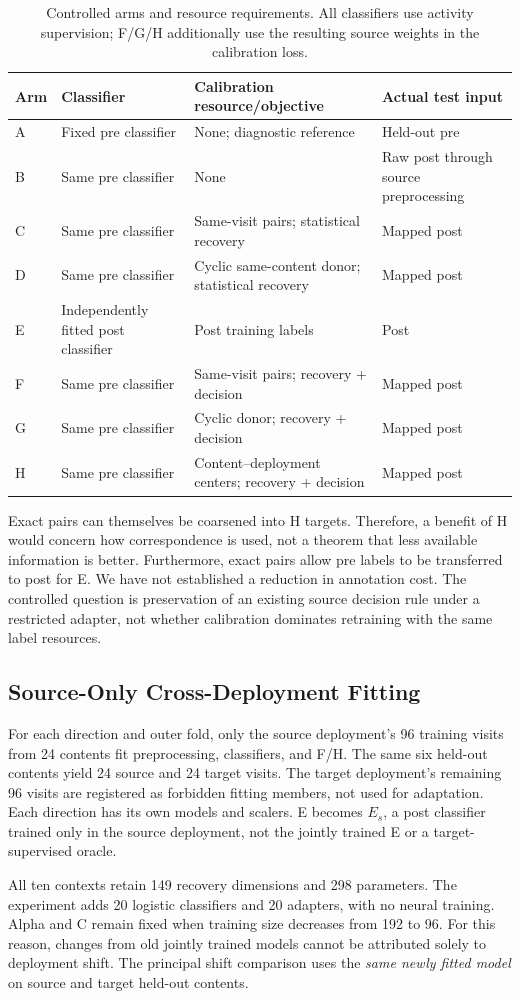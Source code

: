 \begin{table}[t]\centering\caption{Controlled arms and resource requirements. All classifiers use activity supervision; F/G/H additionally use the resulting source weights in the calibration loss.}\label{tab:arms}
\small\setlength{\tabcolsep}{5pt}\begin{tabular}{llll}\toprule
Arm & Classifier & Calibration resource/objective & Actual test input\\\midrule
A & Fixed pre classifier & None; diagnostic reference & Held-out pre\\
B & Same pre classifier & None & Raw post through source preprocessing\\
C & Same pre classifier & Same-visit pairs; statistical recovery & Mapped post\\
D & Same pre classifier & Cyclic same-content donor; statistical recovery & Mapped post\\
E & Independently fitted post classifier & Post training labels & Post\\
F & Same pre classifier & Same-visit pairs; recovery + decision & Mapped post\\
G & Same pre classifier & Cyclic donor; recovery + decision & Mapped post\\
H & Same pre classifier & Content--deployment centers; recovery + decision & Mapped post\\\bottomrule
\end{tabular}\end{table}

Exact pairs can themselves be coarsened into H targets. Therefore, a benefit of H would concern how correspondence is used, not a theorem that less available information is better. Furthermore, exact pairs allow pre labels to be transferred to post for E. We have not established a reduction in annotation cost. The controlled question is preservation of an existing source decision rule under a restricted adapter, not whether calibration dominates retraining with the same label resources.

\subsection{Source-Only Cross-Deployment Fitting}
For each direction and outer fold, only the source deployment's 96 training visits from 24 contents fit preprocessing, classifiers, and F/H. The same six held-out contents yield 24 source and 24 target visits. The target deployment's remaining 96 visits are registered as forbidden fitting members, not used for adaptation. Each direction has its own models and scalers. E becomes $E_s$, a post classifier trained only in the source deployment, not the jointly trained E or a target-supervised oracle.

All ten contexts retain 149 recovery dimensions and 298 parameters. The experiment adds 20 logistic classifiers and 20 adapters, with no neural training. Alpha and C remain fixed when training size decreases from 192 to 96. For this reason, changes from old jointly trained models cannot be attributed solely to deployment shift. The principal shift comparison uses the \emph{same newly fitted model} on source and target held-out contents.
